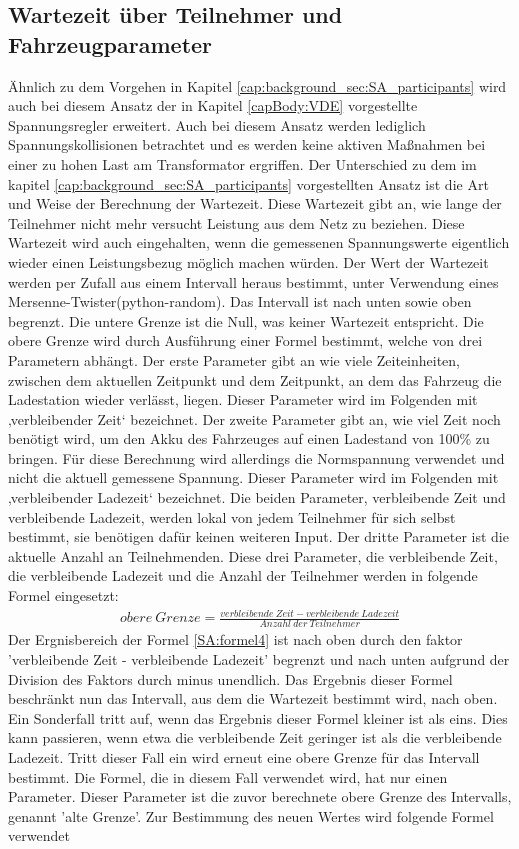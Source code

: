\subsection{Wartezeit über Teilnehmer und Fahrzeugparameter}
Ähnlich zu dem Vorgehen in Kapitel \ref{cap:background_sec:SA_participants} wird auch bei diesem Ansatz der in Kapitel \ref{capBody:VDE} vorgestellte Spannungsregler erweitert. Auch bei diesem Ansatz werden lediglich Spannungskollisionen betrachtet und es werden keine aktiven Maßnahmen bei einer zu hohen Last am Transformator ergriffen. Der Unterschied zu dem im kapitel \ref{cap:background_sec:SA_participants} vorgestellten Ansatz ist die Art und Weise der Berechnung der Wartezeit. Diese Wartezeit gibt an, wie lange der Teilnehmer nicht mehr versucht Leistung aus dem Netz zu beziehen. Diese Wartezeit wird auch eingehalten, wenn die gemessenen Spannungswerte eigentlich wieder einen Leistungsbezug möglich machen würden. Der Wert der Wartezeit werden per Zufall aus einem Intervall heraus bestimmt, unter Verwendung eines Mersenne-Twister(python-random). Das Intervall ist nach unten sowie oben begrenzt. Die untere Grenze ist die Null, was keiner Wartezeit entspricht. Die obere Grenze wird durch Ausführung einer Formel bestimmt, welche von drei Parametern abhängt.  Der erste Parameter gibt an wie viele Zeiteinheiten, zwischen dem aktuellen Zeitpunkt und dem Zeitpunkt, an dem das Fahrzeug die Ladestation wieder verlässt, liegen. Dieser Parameter wird im Folgenden mit ‚verbleibender Zeit‘ bezeichnet. Der zweite Parameter gibt an, wie viel Zeit noch benötigt wird, um den Akku des Fahrzeuges auf einen Ladestand von 100\% zu bringen. Für diese Berechnung wird allerdings die Normspannung verwendet und nicht die aktuell gemessene Spannung. Dieser Parameter wird im Folgenden mit ‚verbleibender Ladezeit‘ bezeichnet. Die beiden Parameter, verbleibende Zeit und verbleibende Ladezeit, werden lokal von jedem Teilnehmer für sich selbst bestimmt, sie benötigen dafür keinen weiteren Input. Der dritte Parameter ist die aktuelle Anzahl an Teilnehmenden. Diese drei Parameter, die verbleibende Zeit, die verbleibende Ladezeit und die Anzahl der Teilnehmer werden in folgende Formel eingesetzt:
\begin{align}
	obere \ Grenze = \frac{verbleibende\ Zeit - verbleibende\ Ladezeit}{Anzahl\ der\ Teilnehmer}
	\label{SA:formel4}
\end{align}
Der Ergnisbereich der Formel \ref{SA:formel4} ist nach oben durch den faktor 'verbleibende Zeit - verbleibende Ladezeit' begrenzt und nach unten aufgrund der Division des Faktors durch minus unendlich. Das Ergebnis dieser Formel beschränkt nun das Intervall, aus dem die Wartezeit bestimmt wird, nach oben. Ein Sonderfall tritt auf, wenn das Ergebnis dieser Formel kleiner ist als eins. Dies kann passieren, wenn etwa die verbleibende Zeit geringer ist als die verbleibende Ladezeit. Tritt dieser Fall ein wird erneut eine obere Grenze für das Intervall bestimmt. Die Formel, die in diesem Fall verwendet wird, hat nur einen Parameter. Dieser Parameter ist die zuvor berechnete obere Grenze des Intervalls, genannt 'alte Grenze'. Zur Bestimmung des neuen Wertes wird folgende Formel verwendet
